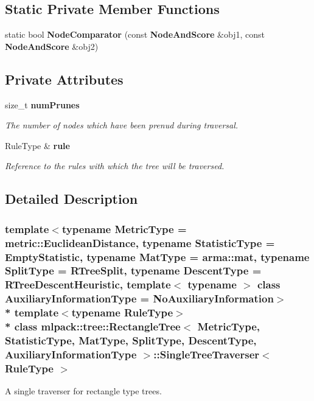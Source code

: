\subsection*{Static Private Member Functions}
\begin{DoxyCompactItemize}
\item 
static bool {\bf Node\+Comparator} (const {\bf Node\+And\+Score} \&obj1, const {\bf Node\+And\+Score} \&obj2)
\end{DoxyCompactItemize}
\subsection*{Private Attributes}
\begin{DoxyCompactItemize}
\item 
size\+\_\+t {\bf num\+Prunes}
\begin{DoxyCompactList}\small\item\em The number of nodes which have been prenud during traversal. \end{DoxyCompactList}\item 
Rule\+Type \& {\bf rule}
\begin{DoxyCompactList}\small\item\em Reference to the rules with which the tree will be traversed. \end{DoxyCompactList}\end{DoxyCompactItemize}


\subsection{Detailed Description}
\subsubsection*{template$<$typename Metric\+Type = metric\+::\+Euclidean\+Distance, typename Statistic\+Type = Empty\+Statistic, typename Mat\+Type = arma\+::mat, typename Split\+Type = R\+Tree\+Split, typename Descent\+Type = R\+Tree\+Descent\+Heuristic, template$<$ typename $>$ class Auxiliary\+Information\+Type = No\+Auxiliary\+Information$>$\\*
template$<$typename Rule\+Type$>$\\*
class mlpack\+::tree\+::\+Rectangle\+Tree$<$ Metric\+Type, Statistic\+Type, Mat\+Type, Split\+Type, Descent\+Type, Auxiliary\+Information\+Type $>$\+::\+Single\+Tree\+Traverser$<$ Rule\+Type $>$}

A single traverser for rectangle type trees. 

